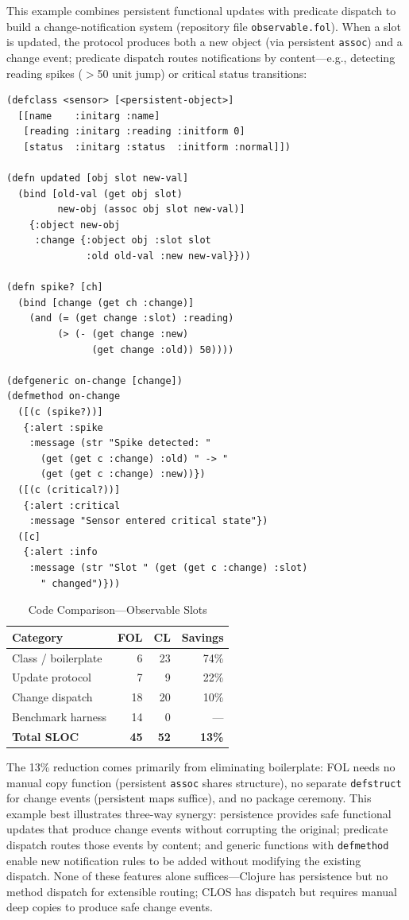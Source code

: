 \documentclass[sigconf,nonacm,review]{acmart}
\begin{document}
This example combines persistent functional updates with predicate dispatch to build a change-notification system (repository file \texttt{observable.fol}). When a slot is updated, the protocol produces both a new object (via persistent \texttt{assoc}) and a change event; predicate dispatch routes notifications by content---e.g., detecting reading spikes ($>$50 unit jump) or critical status transitions:

\begin{lstlisting}
(defclass <sensor> [<persistent-object>]
  [[name    :initarg :name]
   [reading :initarg :reading :initform 0]
   [status  :initarg :status  :initform :normal]])

(defn updated [obj slot new-val]
  (bind [old-val (get obj slot)
         new-obj (assoc obj slot new-val)]
    {:object new-obj
     :change {:object obj :slot slot
              :old old-val :new new-val}}))

(defn spike? [ch]
  (bind [change (get ch :change)]
    (and (= (get change :slot) :reading)
         (> (- (get change :new)
               (get change :old)) 50))))

(defgeneric on-change [change])
(defmethod on-change
  ([(c (spike?))]
   {:alert :spike
    :message (str "Spike detected: "
      (get (get c :change) :old) " -> "
      (get (get c :change) :new))})
  ([(c (critical?))]
   {:alert :critical
    :message "Sensor entered critical state"})
  ([c]
   {:alert :info
    :message (str "Slot " (get (get c :change) :slot)
      " changed")}))
\end{lstlisting}

\begin{table}[htbp]
\caption{Code Comparison---Observable Slots}
\label{tab:observable}
\small
\begin{tabular}{lrrr}
\toprule
\textbf{Category} & \textbf{FOL} & \textbf{CL} & \textbf{Savings} \\
\midrule
Class / boilerplate & 6 & 23 & 74\% \\
Update protocol & 7 & 9 & 22\% \\
Change dispatch & 18 & 20 & 10\% \\
Benchmark harness & 14 & 0 & --- \\
\textbf{Total SLOC} & \textbf{45} & \textbf{52} & \textbf{13\%} \\
\bottomrule
\end{tabular}
\end{table}

The 13\% reduction comes primarily from eliminating boilerplate: FOL needs no manual copy function (persistent \texttt{assoc} shares structure), no separate \texttt{defstruct} for change events (persistent maps suffice), and no package ceremony. This example best illustrates three-way synergy: persistence provides safe functional updates that produce change events without corrupting the original; predicate dispatch routes those events by content; and generic functions with \texttt{defmethod} enable new notification rules to be added without modifying the existing dispatch. None of these features alone suffices---Clojure has persistence but no method dispatch for extensible routing; CLOS has dispatch but requires manual deep copies to produce safe change events.
\end{document}
